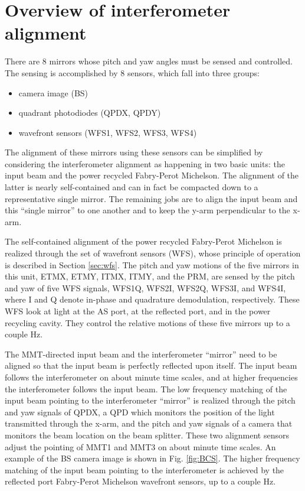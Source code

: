 \section{Overview of interferometer alignment}
\label{sec:alignment_overview}

There are 8 mirrors whose pitch and yaw angles must be sensed and controlled. The sensing is accomplished by 8 sensors, which fall into three groups:
\begin{itemize}
\item camera image (BS)  \vspace{-10pt}
\item quadrant photodiodes (QPDX, QPDY) \vspace{-10pt}
\item wavefront sensors (WFS1, WFS2, WFS3, WFS4)
\end{itemize}
The alignment of these mirrors using these sensors can be simplified by considering the interferometer alignment as happening in two basic units: the input beam and the power recycled Fabry-Perot Michelson. The alignment of the latter is nearly self-contained and can in fact be compacted down to a representative single mirror. The remaining jobs are to align the input beam and this ``single mirror'' to one another and to keep the y-arm perpendicular to the x-arm.

The self-contained alignment of the power recycled Fabry-Perot Michelson is realized through the set of wavefront sensors (WFS), whose principle of operation is described in Section \ref{sec:wfs}. The pitch and yaw motions of the five mirrors in this unit, ETMX, ETMY, ITMX, ITMY, and the PRM, are sensed by the pitch and yaw of five WFS signals, WFS1Q, WFS2I, WFS2Q, WFS3I, and WFS4I, where I and Q denote in-phase and quadrature demodulation, respectively. These WFS look at light at the AS port, at the reflected port, and in the power recycling cavity. They control the relative motions of these five mirrors up to a couple Hz. 

The MMT-directed input beam and the interferometer ``mirror'' need to be aligned so that the input beam is perfectly reflected upon itself. The input beam follows the interferometer on about minute time scales, and at higher frequencies the interferometer follows the input beam. The low frequency matching of the input beam pointing to the interferometer ``mirror'' is realized through the pitch and yaw signals of QPDX, a QPD which monitors the position of the light transmitted through the x-arm, and the pitch and yaw signals of a camera that monitors the beam location on the beam splitter. These two alignment sensors adjust the pointing of MMT1 and MMT3 on about minute time scales. An example of the BS camera image is shown in Fig. \ref{fig:BCS}. The higher frequency matching of the input beam pointing to the interferometer is achieved by the reflected port Fabry-Perot Michelson wavefront sensors, up to a couple Hz.

